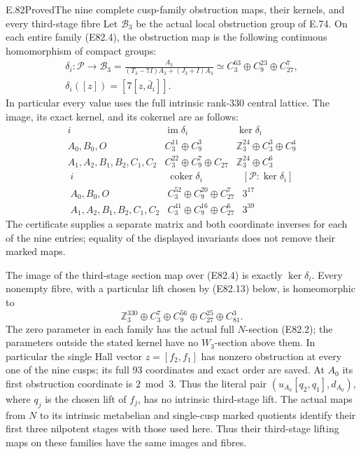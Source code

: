 \begin{statement}{E.82}{Proved}{The nine complete cusp-family obstruction maps, their kernels, and every third-stage fibre}
Let $\mathcal B_3$ be the actual local obstruction group
of E.74. On each entire family (E82.4), the obstruction
map is the following continuous homomorphism of compact groups:
\[
 \begin{gathered}
 \delta_i:\mathcal P\longrightarrow
 \mathcal B_3=
 \frac{A_3}{(T_3-7I)A_3+(J_3+I)A_3}
       \simeq C_3^{63}\oplus C_9^{23}\oplus C_{27}^7,\\
          \delta_i([z])=[7[z,\bar d_i]].
 \end{gathered}
 \tag{E82.6}
\]
In particular every value uses the full intrinsic
rank-$330$ central lattice. The image, its exact kernel,
and its cokernel are as follows:
\[
\begin{array}{c|c|c}
 i&\operatorname{im}\delta_i&\ker\delta_i\\ \hline
 A_0,B_0,O&C_3^{11}\oplus C_9^3&
     \mathbb Z_3^{24}\oplus C_3^3\oplus C_9^4\\
 A_1,A_2,B_1,B_2,C_1,C_2&
     C_3^{22}\oplus C_9^7\oplus C_{27}&
     \mathbb Z_3^{24}\oplus C_3^6
\end{array}
 \tag{E82.7}
\]
\[
 \begin{array}{c|c|c}
 i&\operatorname{coker}\delta_i&
       [\mathcal P:\ker\delta_i]\\ \hline
 A_0,B_0,O&C_3^{52}\oplus C_9^{20}\oplus C_{27}^7&3^{17}\\
 A_1,A_2,B_1,B_2,C_1,C_2&
      C_3^{41}\oplus C_9^{16}\oplus C_{27}^6&3^{39}
 \end{array}
 \tag{E82.8}
\]
The certificate supplies a separate matrix and both coordinate
inverses for each of the nine entries; equality of the displayed
invariants does not remove their marked maps.

The image of the third-stage section map over (E82.4) is
exactly $\ker\delta_i$. Every nonempty fibre, with a particular
lift chosen by (E82.13) below, is homeomorphic to
\[
 \mathbb Z_3^{330}\oplus C_3^7\oplus C_9^{56}
                    \oplus C_{27}^{25}\oplus C_{81}^3.
 \tag{E82.9}
\]
The zero parameter in each family has the actual full
$N$-section (E82.2); the parameters outside the stated
kernel have no $W_3$-section above them.
In particular the single Hall vector $z=[f_2,f_1]$
has nonzero obstruction at every one of the nine cusps;
its full $93$ coordinates and exact order are saved.
At $A_0$ its first obstruction coordinate is
$2\bmod3$. Thus the literal pair
$(u_{A_0}[q_2,q_1],d_{A_0})$, where $q_j$ is the
chosen lift of $f_j$, has no intrinsic third-stage lift.
The actual maps from $N$ to its intrinsic metabelian and
single-cusp marked quotients identify their first three
nilpotent stages with those used here. Thus their
third-stage lifting maps on these families have the same
images and fibres.


\end{statement}
